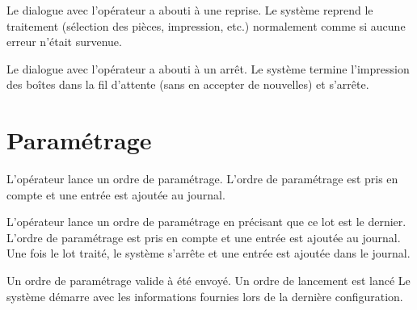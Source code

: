 {Le dialogue avec l'opérateur a abouti à une reprise.}
{Le système reprend le traitement (sélection des pièces, impression, etc.) normalement comme si aucune erreur n'était survenue.}

{Le dialogue avec l'opérateur a abouti à un arrêt.}
{Le système termine l'impression des boîtes dans la fil d'attente (sans en accepter de nouvelles) et s'arrête.}

\section{Paramétrage}
{L'opérateur lance un ordre de paramétrage.}
{L'ordre de paramétrage est pris en compte et une entrée est ajoutée au journal.}

{L'opérateur lance un ordre de paramétrage en précisant que ce lot est le dernier.}
{L'ordre de paramétrage est pris en compte et une entrée est ajoutée au journal. Une fois le lot traité, le système s'arrête et une entrée est ajoutée dans le journal.}

{Un ordre de paramétrage valide à été envoyé. Un ordre de lancement est lancé}
{Le système démarre avec les informations fournies lors de la dernière configuration.}


